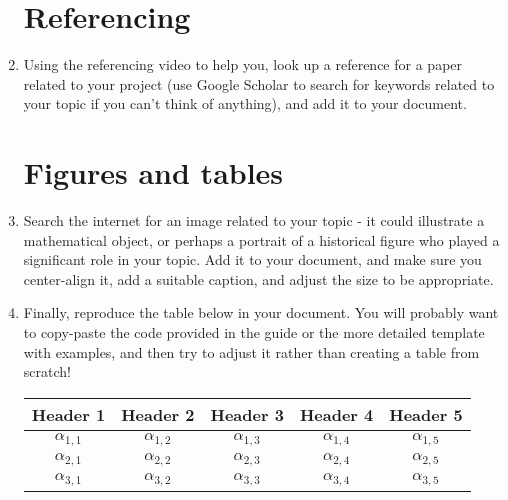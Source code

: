 \documentclass[12pt,fleqn]{article}
\begin{document}
\begin{enumerate}
\begin{enumerate}
	\end{enumerate}
	
	
	\section*{Referencing}
	\item Using the referencing video to help you, look up a reference for a paper related to your project (use Google Scholar to search for keywords related to your topic if you can't think of anything), and add it to your document. 
	
	\section*{Figures and tables}
	\item Search the internet for an image related to your topic - it could illustrate a mathematical object, or perhaps a portrait of a historical figure who played a significant role in your topic. Add it to your document, and make sure you center-align it, add a suitable caption, and adjust the size to be appropriate.
	
	\item Finally, reproduce the table below in your document. You will probably want to copy-paste the code provided in the guide or the more detailed template with examples, and then try to adjust it rather than creating a table from scratch!\\
	
	 \begin{table}[H]
	 \centering
    \begin{tabular}{|c|c|c|c|c|} %
        \hline
        \textbf{Header 1} & \textbf{Header 2} & \textbf{Header 3} & \textbf{Header 4}  & \textbf{Header 5}  \\
        \hline
        $\alpha_{1,1}$ & $\alpha_{1,2}$ & $\alpha_{1,3}$ & $\alpha_{1,4}$ & $\alpha_{1,5}$ \\
        $\alpha_{2,1}$ & $\alpha_{2,2}$ & $\alpha_{2,3}$ & $\alpha_{2,4}$ & $\alpha_{2,5}$ \\
        $\alpha_{3,1}$ & $\alpha_{3,2}$ & $\alpha_{3,3}$ & $\alpha_{3,4}$ & $\alpha_{3,5}$ \\
        \hline
    \end{tabular}
  \end{table}

\end{enumerate}

	
\end{document}
